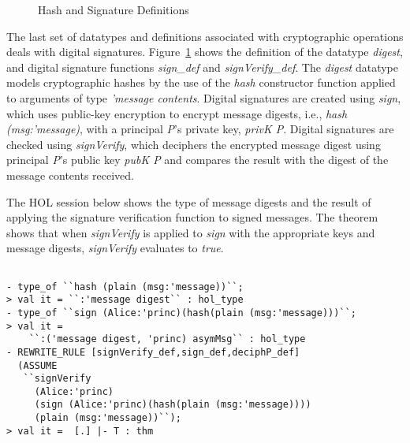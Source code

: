 \begin{figure}[tb]
  \centering
  \begin{minipage}{1.0\linewidth}
    \HOLcipherDatatypesdigest
    \vspace*{-0.1in}
    \HOLcipherDefinitionssignXXdef
    \vspace*{-0.1in}
    \HOLcipherDefinitionssignVerifyXXdef
  \end{minipage}
  \caption{Hash and Signature Definitions}
  \label{fig:hash-signature}
\end{figure}

The last set of datatypes and definitions associated with
cryptographic operations deals with digital
signatures. Figure~\ref{fig:hash-signature} shows the definition of
the datatype \emph{digest}, and digital signature functions
\emph{sign\_def} and \emph{signVerify\_def}. The \emph{digest}
datatype models cryptographic hashes by the use of the \emph{hash}
constructor function applied to arguments of type \emph{'message
  contents}. Digital signatures are created using \emph{sign}, which
uses public-key encryption to encrypt message digests, i.e.,
\emph{hash (msg:'message)}, with a principal \emph{P}'s private key,
\emph{privK P}. Digital signatures are checked using
\emph{signVerify}, which deciphers the encrypted message digest using
principal \emph{P}'s public key \emph{pubK P} and compares the result
with the digest of the message contents received.

The HOL session below shows the type of message digests and the result
of applying the signature verification function to signed
messages. The theorem shows that when \emph{signVerify} is applied to
\emph{sign} with the appropriate keys and message digests,
\emph{signVerify} evaluates to \emph{true}.
\begin{session}
  \begin{scriptsize}
\begin{verbatim}

- type_of ``hash (plain (msg:'message))``;
> val it = ``:'message digest`` : hol_type
- type_of ``sign (Alice:'princ)(hash(plain (msg:'message)))``;
> val it =
    ``:('message digest, 'princ) asymMsg`` : hol_type
- REWRITE_RULE [signVerify_def,sign_def,deciphP_def]
  (ASSUME
   ``signVerify
     (Alice:'princ)
     (sign (Alice:'princ)(hash(plain (msg:'message))))
     (plain (msg:'message))``);
> val it =  [.] |- T : thm
\end{verbatim}
  \end{scriptsize}
\end{session}

